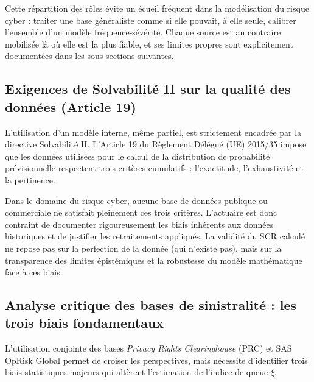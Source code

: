\documentclass[11pt,a4paper]{article}
\theoremstyle{navystyle}
\theoremstyle{navydef}
\begin{document}
Cette répartition des rôles évite un écueil fréquent dans la modélisation du
risque cyber : traiter une base généraliste comme si elle pouvait, à elle
seule, calibrer l'ensemble d'un modèle fréquence-sévérité. Chaque source est
au contraire mobilisée là où elle est la plus fiable, et ses limites propres
sont explicitement documentées dans les sous-sections suivantes.

\subsection{Exigences de Solvabilité II sur la qualité des données (Article 19)}

L'utilisation d'un modèle interne, même partiel, est strictement encadrée par la directive Solvabilité II. L'Article 19 du Règlement Délégué (UE) 2015/35 impose que les données utilisées pour le calcul de la distribution de probabilité prévisionnelle respectent trois critères cumulatifs : l'exactitude, l'exhaustivité et la pertinence. 

Dans le domaine du risque cyber, aucune base de données publique ou commerciale ne satisfait pleinement ces trois critères. L'actuaire est donc contraint de documenter rigoureusement les biais inhérents aux données historiques et de justifier les retraitements appliqués. La validité du SCR calculé ne repose pas sur la perfection de la donnée (qui n'existe pas), mais sur la transparence des limites épistémiques et la robustesse du modèle mathématique face à ces biais.

\subsection{Analyse critique des bases de sinistralité : les trois biais fondamentaux}

L'utilisation conjointe des bases \textit{Privacy Rights Clearinghouse} (PRC) et SAS OpRisk Global permet de croiser les perspectives, mais nécessite d'identifier trois biais statistiques majeurs qui altèrent l'estimation de l'indice de queue $\xi$.
\end{document}

